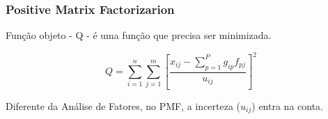 \begin{frame}
  \frametitle{Positive Matrix Factorizarion}

  Função objeto - Q -  é uma função que precisa ser minimizada. 
 
  \begin{equation}
    Q = \sum_{i=1}^n \sum_{j=1}^m  \left[ \frac{ x_{ij} - \sum_{p=1}^{P} g_{ip}f_{pj}} {u_{ij}} \right] ^2
  \end{equation}

  Diferente da Análise de Fatores, no PMF, a incerteza ($u_{ij}$) entra na conta.
\end{frame}

